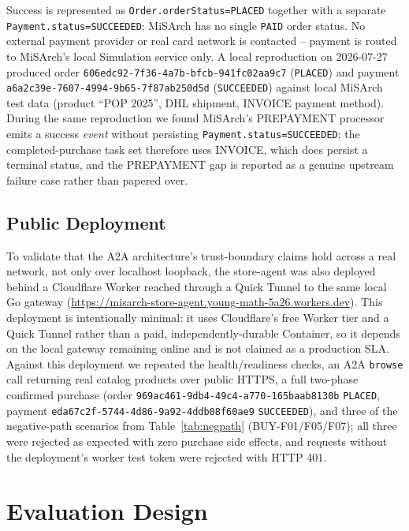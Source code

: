 \documentclass[conference]{IEEEtran}
\begin{document}
Success is represented as \texttt{Order.orderStatus=PLACED} together with a
separate \texttt{Payment.status=SUCCEEDED}; MiSArch has no single
\texttt{PAID} order status. No external payment provider or real card
network is contacted -- payment is routed to MiSArch's local Simulation
service only. A local reproduction on 2026-07-27 produced order
\texttt{606edc92-7f36-4a7b-bfcb-941fc02aa9c7} (\texttt{PLACED}) and payment
\texttt{a6a2c39e-7607-4994-9b65-7f87ab250d5d} (\texttt{SUCCEEDED}) against
local MiSArch test data (product ``POP 2025'', DHL shipment, INVOICE payment
method). During the same reproduction we found MiSArch's PREPAYMENT
processor emits a success \emph{event} without persisting
\texttt{Payment.status=SUCCEEDED}; the completed-purchase task set therefore
uses INVOICE, which does persist a terminal status, and the PREPAYMENT gap is
reported as a genuine upstream failure case rather than papered over.

\subsection{Public Deployment}
\label{sec:deploy}

To validate that the A2A architecture's trust-boundary claims hold across a
real network, not only over localhost loopback, the store-agent was also
deployed behind a Cloudflare Worker reached through a Quick Tunnel to the
same local Go gateway
(\url{https://misarch-store-agent.young-math-5a26.workers.dev}). This
deployment is intentionally minimal: it uses Cloudflare's free Worker tier
and a Quick Tunnel rather than a paid, independently-durable Container, so it
depends on the local gateway remaining online and is not claimed as a
production SLA. Against this deployment we repeated the health/readiness
checks, an A2A \texttt{browse} call returning real catalog products over
public HTTPS, a full two-phase confirmed purchase (order
\texttt{969ac461-9db4-49c4-a770-165baab8130b} \texttt{PLACED}, payment
\texttt{eda67c2f-5744-4d86-9a92-4ddb08f60ae9} \texttt{SUCCEEDED}), and three
of the negative-path scenarios from Table~\ref{tab:negpath}
(BUY-F01/F05/F07); all three were rejected as expected with zero purchase
side effects, and requests without the deployment's worker test token were
rejected with HTTP 401.

\section{Evaluation Design}
\end{document}
